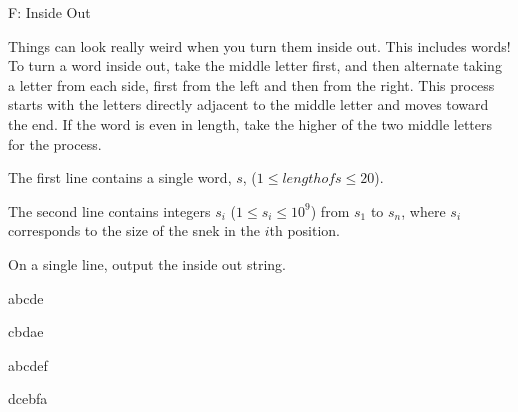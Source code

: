 \begin{problem}{F: Inside Out}

Things can look really weird when you turn them inside out.
This includes words!
To turn a word inside out, take the middle letter first, and then alternate taking a letter from each side, first from the left and then from the right.
This process starts with the letters directly adjacent to the middle letter and moves toward the end.
If the word is even in length, take the higher of the two middle letters for the process.
\end{problem}

\begin{formalin}
The first line contains a single word, $s$, ($1 \leq length of s \leq 20$).

The second line contains integers $s_i$ ($1 \leq s_i \leq 10^9$) from $s_1$ to $s_n$, where $s_i$ corresponds to the size of the snek in the $i$th position.
\end{formalin}

\begin{formalout}
On a single line, output the inside out string.
\end{formalout}

\begin{datain}
abcde
\end{datain}
\begin{dataout}
cbdae
\end{dataout}

\begin{datain}
abcdef
\end{datain}
\begin{dataout}
dcebfa
\end{dataout}
